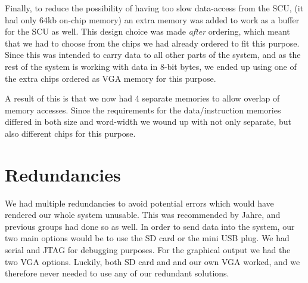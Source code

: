Finally, to reduce the possibility of having too slow data-access from the SCU,
(it had only 64kb on-chip memory) an extra memory was added to work as a buffer
for the SCU as well. This design choice was made {\em after} ordering, which
meant that we had to choose from the chips we had already ordered to fit this
purpose. Since this was intended to carry data to all other parts of the system,
and as the rest of the system is working with data in 8-bit bytes, we ended up
using one of the extra chips ordered as \ac{VGA} memory for this purpose.

A result of this is that we now had 4 separate memories to allow overlap of
memory accesses. Since the requirements for the data/instruction memories
differed in both size and word-width we wound up with not only separate, but
also different chips for this purpose.

\section{Redundancies}
We had multiple redundancies to avoid potential errors which would have rendered
our whole system unusable. This was recommended by Jahre, and previous groups
had done so as well. In order to send data into the system, our two main options
would be to use the \ac{SD} card or the mini \ac{USB} plug. We had serial and
\ac{JTAG} for debugging purposes. For the graphical output we had the two
\ac{VGA} options. Luckily, both \ac{SD} card and and our own \ac{VGA} worked,
and we therefore never needed to use any of our redundant solutions.
